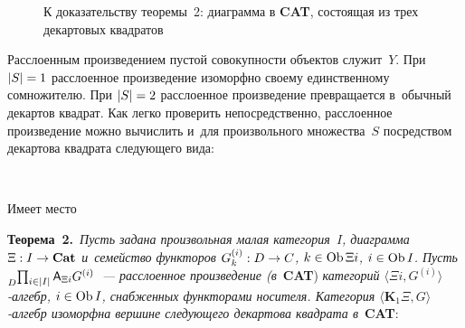 \begin{multicols}{2}
\begin{figure*}
\begin{center}
\vspace*{5pt}
{\small К доказательству теоремы~2: диаграмма в \textbf{CAT}, состоящая из трех декартовых квадратов}

\end{center}
\vspace*{-6pt}
\end{figure*}
 
Расслоенным произведением пустой совокупности объектов служит~$Y$. При 
$\vert S\vert \hm=1$ рас\-сло\-ен\-ное произведение изоморфно своему 
единственному сомножителю. При $\vert S\vert \hm=2$ расслоенное 
произведение превращается в~обычный декартов квад\-рат. Как легко проверить 
непосредственно, рас\-сло\-ен\-ное произведение мож\-но вы\-чис\-лить и~для 
произвольного множества~$S$ посредством декартова квад\-ра\-та сле\-ду\-юще\-го 
вида:
  \vspace*{1pt}
  
  \begin{center}  
    \mbox{%
\epsfxsize=38.23mm
}

\end{center}
 
  Имеет место
  
  \smallskip
  
  \noindent
  \textbf{Теорема~2.}\ \textit{Пусть задана произвольная малая категория~$I$, 
диаграмма $\Xi : I\hm\to \mathbf{Cat}$ и~семейство функторов $G^{(i)}_k : 
D \hm\to  C$, $k\hm\in \mathrm{Ob}\,\Xi i$, $i\hm\in \mathrm{Ob}\,I$. Пусть 
${\vphantom{\prod_{s\in S}}}_D\!\prod_{i\in \vert I\vert} {\sf A}_{\Xi i} G^{(i)}$~--- расслоенное 
произведение (в}~\textbf{CAT}) \textit{категорий $\langle \Xi i, G^{(i)}\rangle$-ал\-гебр, 
$i\hm\in \mathrm{Ob}\,I$, снаб\-жен\-ных функторами носителя. Категория 
$\langle \mathbf{K}_1\Xi,  
G\rangle$-ал\-гебр изоморфна вершине сле\-ду\-юще\-го декартова квад\-ра\-та 
в}~\textbf{CAT}:
  \vspace*{1pt}
  
  \begin{center}  
    \mbox{%
\epsfxsize=63.014mm
}

\end{center}
 
  
  

\end{multicols}
